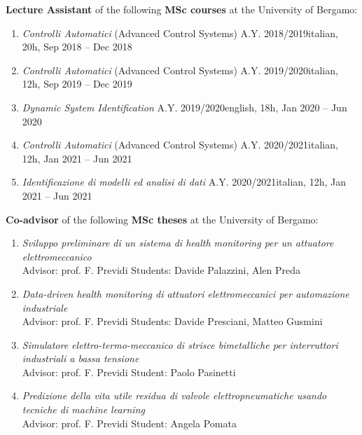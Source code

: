 \documentclass[10pt]{article}
\begin{document}
\textbf{Lecture Assistant} of the following \textbf{MSc courses} at the University of Bergamo:
\begin{enumerate}
	\setlength\itemsep{-3pt}
	\item \textit{Controlli Automatici} (Advanced Control Systems) A.Y. 2018/2019\hfill italian, 20h, Sep 2018 – Dec 2018\\
	\item \textit{Controlli Automatici} (Advanced Control Systems) A.Y. 2019/2020\hfill italian, 12h, Sep 2019 – Dec 2019\\
	\item \textit{Dynamic System Identification} A.Y. 2019/2020\hfill english, 18h, Jan 2020 – Jun 2020\\
	\item \textit{Controlli Automatici} (Advanced Control Systems) A.Y. 2020/2021\hfill italian, 12h, Jan 2021 – Jun 2021\\
	\item \textit{Identificazione di modelli ed analisi di dati} A.Y. 2020/2021\hfill italian, 12h, Jan 2021 – Jun 2021
\end{enumerate}

\vspace{6pt} %

\textbf{Co-advisor} of the following \textbf{MSc theses} at the University of Bergamo:
\begin{enumerate}
	\setlength\itemsep{-3pt}
	\item \textit{Sviluppo preliminare di un sistema di health monitoring per un attuatore elettromeccanico}\\
	Advisor: prof. F. Previdi \hfill Students: Davide Palazzini, Alen Preda
	\item \textit{Data-driven health monitoring di attuatori elettromeccanici per automazione industriale}\\
	Advisor: prof. F. Previdi \hfill Students: Davide Presciani, Matteo Gusmini
	\item \textit{Simulatore elettro-termo-meccanico di strisce bimetalliche per interruttori industriali a bassa tensione}\\
	Advisor: prof. F. Previdi \hfill Student: Paolo Pasinetti
	\item \textit{Predizione della vita utile residua di valvole elettropneumatiche usando tecniche di machine learning}\\
	Advisor: prof. F. Previdi \hfill Student: Angela Pomata
\end{enumerate}
\end{document}
